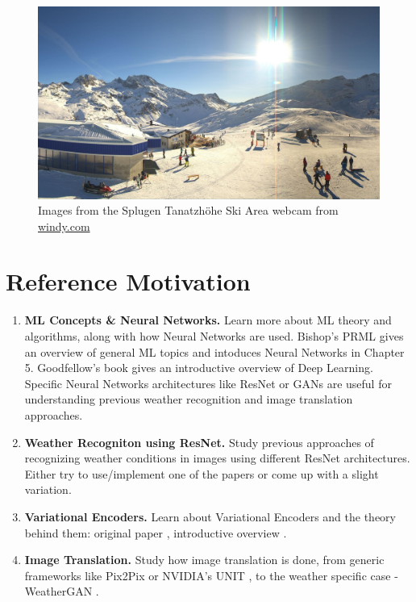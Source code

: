 \documentclass[11pt]{article}
\begin{document}
\begin{figure}[!htb]
            \includegraphics[width=\linewidth]{images/4_snowy_sunny.jpg}
        \endminipage\hfill
        \caption{Images from the Splugen Tanatzhöhe Ski Area webcam from \href{windy.com}{windy.com}}
        \label{fig:windy}
    \end{figure}
    \section{Reference Motivation}
    \begin{enumerate}
        \item \textbf{ML Concepts \& Neural Networks.}
            Learn more about ML theory and algorithms, along with how Neural Networks are used.
            Bishop's PRML \cite{bishop:2006:PRML} gives an overview of general ML topics and intoduces 
            Neural Networks in Chapter 5. Goodfellow's \cite{Goodfellow-et-al-2016} book gives an introductive 
            overview of Deep Learning. Specific Neural Networks architectures like ResNet 
            \cite{DBLP:journals/corr/HeZRS15} or GANs \cite{https://doi.org/10.48550/arxiv.1406.2661}
            are useful for understanding previous weather recognition and image translation approaches.
        \item \textbf{Weather Recogniton using ResNet.}
            Study previous approaches 
            \cite{DBLP:journals/corr/abs-1910-09910, DBLP:journals/corr/abs-1904-10709, 
            DBLP:journals/corr/abs-2103-05422} of recognizing weather conditions in images using different
            ResNet architectures. Either try to use/implement one of the papers or come up with a slight variation.

        \item \textbf{Variational Encoders.}
            Learn about Variational Encoders and the theory behind them: original paper 
            \cite{DBLP:journals/corr/abs-1906-02691}, introductive overview 
            \cite{https://doi.org/10.48550/arxiv.1312.6114}.
        \item \textbf{Image Translation.}
            Study how image translation is done, from generic frameworks like Pix2Pix 
            \cite{DBLP:journals/corr/IsolaZZE16} or NVIDIA's UNIT \cite{DBLP:journals/corr/LiuBK17},
            to the weather specific case - WeatherGAN \cite{DBLP:journals/corr/abs-2103-05422}.
    \end{enumerate}
\end{document}
